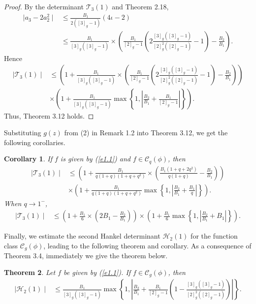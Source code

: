 \documentclass[11pt,twoside, reqno]{article}
\newtheorem{theorem}{Theorem}[section]
\newtheorem{corollary}[theorem]{Corollary}
\theoremstyle{definition}
\begin{document}
\begin{proof}
By the determinant $\mathcal{T}_3(1)$ and Theorem 2.18,
\begin{align}\nonumber
\mid a_{3}-2a_{2}^{2}\mid & \leq \frac{B_{1}}{2([3]_{g}-1)}(4\iota - 2) \\\nonumber
&\leq\frac{B_{1}}{[3]_{g}([3]_{g}-1)}\times\left(\frac{B_{1}}{[2]_{g}-1}\left(2\frac{[3]_{g}([3]_{g}-1)}{[2]_{g}^{2}([2]_{g}-1)}-1\right)-\frac{B_{2}}{B_{1}}\right).
\end{align}
Hence
\begin{align}\nonumber
\mid \mathcal{T}_3(1)\mid &\leq \left(1+\frac{B_{1}}{[3]_{g}([3]_{g}-1)}\times\left(\frac{B_{1}}{[2]_{g}-1}\left(2\frac{[3]_{g}([3]_{g}-1)}{[2]_{g}^{2}([2]_{g}-1)}-1\right)-\frac{B_{2}}{B_{1}}\right)\right)\\\nonumber
&\times\left(1+\frac{B_{1}}{[3]_{g}([3]_{g}-1)}\max\left\{1, \left|\frac{B_{2}}{B_{1}}+\frac{B_{1}}{[2]_{g}-1}\right|\right\}\right).
\end{align}
Thus, Theorem 3.12 holds.
\end{proof}
Substituting $g(z)$ from (2) in Remark 1.2 into Theorem 3.12, we get the following corollaries.
\begin{corollary}
If $f$ is given by (\ref{e1.1}) and $f\in\mathcal{C}_{q}(\phi)$, then
\begin{align}\nonumber
\mid \mathcal{T}_3(1)\mid &\leq \left(1+\frac{B_{1}}{q(1+q)(1+q+q^{2})}\times\left(\frac{B_{1}(1+q+2q^{2})}{q(1+q)}-\frac{B_{2}}{B_{1}}\right)\right)\\\nonumber
&\times\left(1+\frac{B_{1}}{q(1+q)(1+q+q^{2})}\max\left\{1, \left|\frac{B_{2}}{B_{1}}+\frac{B_{1}}{q}\right|\right\}\right).
\end{align}
When $q\rightarrow1^{-}$,
\begin{align}\nonumber
\mid \mathcal{T}_3(1)\mid &\leq \left(1+\frac{B_{1}}{6}\times\left(2B_{1}-\frac{B_{2}}{B_{1}}\right)\right)
\times\left(1+\frac{B_{1}}{6}\max\left\{1, \left|\frac{B_{2}}{B_{1}}+B_{1}\right|\right\}\right).
\end{align}
\end{corollary}
Finally, we estimate the second Hankel determinant $\mathcal{H}_2(1)$ for the function class $\mathcal{C}_{g}(\phi)$, leading to the following theorem and corollary. As a consequence of Theorem 3.4, immediately we give the theorem below.
\begin{theorem}
Let $f$ be given by (\ref{e1.1}). If $f\in\mathcal{C}_{g}(\phi)$, then
\begin{align}\nonumber
\mid \mathcal{H}_2(1)\mid &\leq \frac{B_{1}}{[3]_{g}([3]_{g}-1)}\max\left\{1,\left|\frac{B_{2}}{B_{1}}+
\frac{B_{1}}{[2]_{g}-1}\left(1-\frac{[3]_{g}([3]_{g}-1)}{[2]_{g}^{2}([2]_{g}-1)}\right)\right|\right\}.
\end{align}
\end{theorem}
\end{document}
